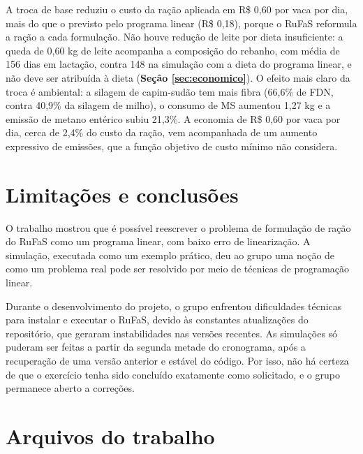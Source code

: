 \documentclass[a4paper,12pt]{article}
\begin{document}
A troca de base reduziu o custo da ração aplicada em R\$ 0,60 por vaca por dia, mais do que o previsto pelo programa linear (R\$ 0,18), porque o RuFaS reformula a ração a cada formulação. Não houve redução de leite por dieta insuficiente: a queda de 0,60 kg de leite acompanha a composição do rebanho, com média de 156 dias em lactação, contra 148 na simulação com a dieta do programa linear, e não deve ser atribuída à dieta (\textbf{Seção \ref{sec:economico}}). O efeito mais claro da troca é ambiental: a silagem de capim-sudão tem mais fibra (66,6\% de FDN, contra 40,9\% da silagem de milho), o consumo de MS aumentou 1,27 kg e a emissão de metano entérico subiu 21,3\%. A economia de R\$ 0,60 por vaca por dia, cerca de 2,4\% do custo da ração, vem acompanhada de um aumento expressivo de emissões, que a função objetivo de custo mínimo não considera.

\newpage
\section{Limitações e conclusões}\label{sec:conclusao}

O trabalho mostrou que é possível reescrever o problema de formulação de ração do RuFaS como um programa linear, com baixo erro de linearização. A simulação, executada como um exemplo prático, deu ao grupo uma noção de como um problema real pode ser resolvido por meio de técnicas de programação linear.

Durante o desenvolvimento do projeto, o grupo enfrentou dificuldades técnicas para instalar e executar o RuFaS, devido às constantes atualizações do repositório, que geraram instabilidades nas versões recentes. As simulações só puderam ser feitas a partir da segunda metade do cronograma, após a recuperação de uma versão anterior e estável do código. Por isso, não há certeza de que o exercício tenha sido concluído exatamente como solicitado, e o grupo permanece aberto a correções.

\newpage


\newpage
\appendix
\renewcommand{\thesection}{Apêndice \Alph{section}}

\section{Arquivos do trabalho}\label{sec:anexoarquivos}
\end{document}
